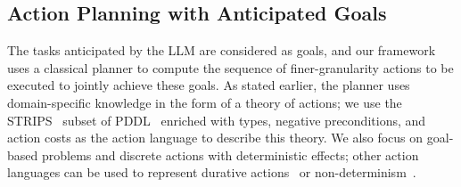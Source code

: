 


\subsection{Action Planning with Anticipated Goals}
The tasks anticipated by the LLM are considered as goals, and our framework uses a classical planner to compute the sequence of finer-granularity actions to be executed to jointly achieve these goals. As stated earlier, the planner uses domain-specific knowledge in the form of a theory of actions; we use the STRIPS~\cite{STRIPS} subset of PDDL~\cite{pddl} enriched with types, negative preconditions, and action costs as the action language to describe this theory. We also focus on goal-based problems and discrete actions with deterministic effects; other action languages can be used to represent durative actions~\cite{gerevini:FI11} or non-determinism~\cite{mohan:JAIR19}.

